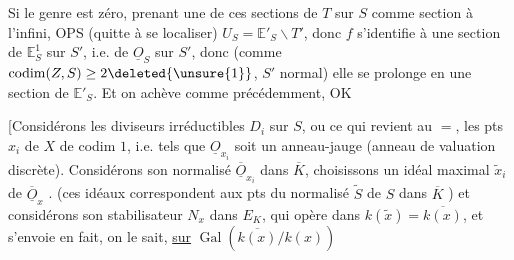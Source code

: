 Si le genre est zéro, prenant une de ces sections de $T$ sur $S$ comme section à l'infini, OPS (quitte à se localiser) $U_S=\mathbb E'_S\smallsetminus T'$, donc $f$ s'identifie à une section de $\mathbb E^1_S$ sur $S'$, i.e. de $\underline O_S$ sur $S'$, donc (comme $\operatorname{codim}(Z,S)\geq2\deleted{\unsure{1}}$, $S'$ normal) elle se prolonge en une section de $\mathbb E'_S$. Et on achève comme précédemment, OK

[Considérons  les diviseurs irréductibles $D_i$ sur $S$, ou ce qui revient au $=$, les pts $x_i$ de $X$ de codim $1$, i.e. tels que $\underline O_{x_i}$ soit un anneau-jauge (anneau de valuation discrète). Considérons son normalisé $\overline{\underline O}_{x_i}$ dans $\overline K$, choisissons un idéal maximal $\widetilde x_i$ de $\overline{\underline O}_x$ . (ces idéaux correspondent aux pts du normalisé $\widetilde S$ de $S$ dans $\overline K$ ) et considérons son stabilisateur $N_x$ dans  $E_K$, qui opère  dans $k(\widetilde x)=\overline{k(x)}$, et s'envoie en fait, on le sait, \uline{sur} $\operatorname{Gal}(\overline{k(x)}/k(x))$
